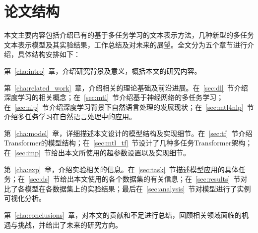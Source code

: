 \section{论文结构}

本文主要内容包括介绍已有的基于多任务学习的文本表示方法，几种新型的多任务文本表示模型及其实验结果，工作总结及对未来的展望。全文分为五个章节进行介绍，具体结构安排如下：

第~\ref{cha:intro}~章，介绍研究背景及意义，概括本文的研究内容。

第~\ref{cha:related_work}~章，介绍相关的理论基础及前沿进展。在~\ref{sec:dl}~节介绍深度学习的相关概念；在~\ref{sec:mtl}~节介绍基于神经网络的多任务学习；在~\ref{sec:nlp}~节介绍深度学习背景下自然语言处理的发展现状；在~\ref{sec:mtl4nlp}~节介绍多任务学习在自然语言处理中的应用。

第~\ref{cha:model}~章，详细描述本文设计的模型结构及实现细节。在~\ref{sec:tf}~节介绍Transformer的模型结构；在~\ref{sec:mtl_tf}~节设计了几种多任务Transformer架构；在~\ref{sec:imp}~节给出本文所使用的超参数设置以及实现细节。

第~\ref{cha:exp}~章，介绍实验相关的信息。在~\ref{sec:task}~节描述模型应用的具体任务；在~\ref{sec:ds}~节给出本文使用的各个数据集的有关信息；在~\ref{sec:results}~节对比了各模型在各数据集上的实验结果；最后在~\ref{sec:analysis}~节对模型进行了实例可视化分析。

第~\ref{cha:conclusions}~章，对本文的贡献和不足进行总结，回顾相关领域面临的机遇与挑战，并给出了未来的研究方向。

